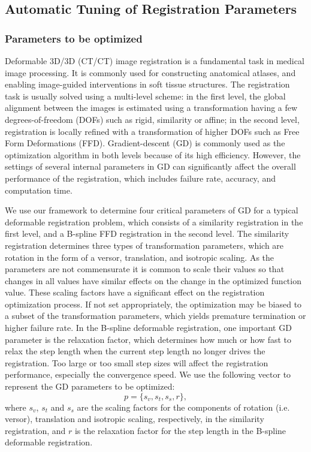\documentclass[]{spie}  %
\begin{document}
\subsection{Automatic Tuning of Registration Parameters}

\subsubsection{Parameters to be optimized}

Deformable 3D/3D (CT/CT) image registration is a fundamental task in medical image processing. It is commonly used for constructing anatomical atlases, and enabling image-guided interventions in soft tissue structures. The registration task is usually solved using a multi-level scheme: in the first level, the global alignment between the images is estimated using a transformation having a few degrees-of-freedom (DOFs) such as rigid, similarity or affine; in the second level, registration is locally refined with a transformation of higher DOFs such as Free Form Deformations (FFD). Gradient-descent (GD) is commonly used as the optimization algorithm in both levels because of its high efficiency. However, the settings of several internal parameters in GD can significantly affect the overall performance of the registration, which includes failure rate, accuracy, and computation time.

We use our framework to determine four critical parameters of GD for a typical deformable registration problem, which consists of a similarity registration in the first level, and a B-spline FFD registration in the second level.
The similarity registration determines three types of transformation parameters, which are rotation in the form of a versor, translation, and isotropic scaling. As the parameters are not commensurate it is common to scale their values so that changes in all values have similar effects on the change in the optimized function value. These scaling factors have a significant effect on the registration optimization process. If not set appropriately, the optimization may be biased to a subset of the transformation parameters, which yields premature termination or higher failure rate.
In the B-spline deformable registration, one important GD parameter is the relaxation factor, which determines how much or how fast to relax the step length when the current step length no longer drives the registration. Too large or too small step sizes will affect the registration performance, especially the convergence speed.
We use the following vector to represent the GD parameters to be optimized:
\begin{equation}
p = \{s_{v},s_{t},s_{s},r\},
\end{equation}
where $s_{v}$, $s_{t}$ and $s_{s}$ are the scaling factors for the components of rotation (i.e. versor), translation and isotropic scaling, respectively, in the similarity registration, and $r$ is the relaxation factor for the step length in the B-spline deformable registration.
\end{document}
